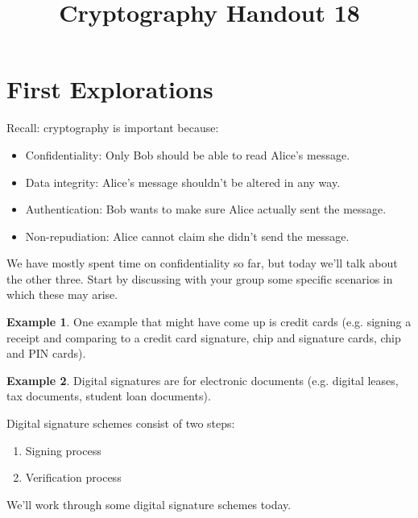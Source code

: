 \documentclass[12pt]{amsart}
\makeatletter
\def\subtitle#1{\gdef\@subtitle{#1}}
\def\@subtitle{}
\theoremstyle{plain}
\theoremstyle{definition}
\newtheorem*{ex}{Example}
\theoremstyle{remark}
\makeatother
\begin{document}
\onehalfspacing

\title[]{Cryptography Handout 18}
\subtitle{Digital Signatures}
\maketitle

\section{First Explorations}
Recall: cryptography is important because:
\begin{itemize}
	\item Confidentiality: Only Bob should be able to read Alice's message.
	\item Data integrity: Alice's message shouldn't be altered in any way.
	\item Authentication: Bob wants to make sure Alice actually sent the message.
	\item Non-repudiation: Alice cannot claim she didn't send the message.
\end{itemize}

We have mostly spent time on confidentiality so far, but today we'll talk about the other three.  Start by discussing with your group some specific scenarios in which these may arise.\\

\vspace{1in}


\begin{ex}
One example that might have come up is credit cards (e.g. signing a receipt and comparing to a credit card signature, chip and signature cards, chip and PIN cards).
\end{ex}

\begin{ex}
Digital signatures are for electronic documents (e.g. digital leases, tax documents, student loan documents).  
\end{ex}

\begin{framed}
Digital signature schemes consist of two steps:
\begin{enumerate}[1.]
	\item Signing process
	\item Verification process
\end{enumerate}
\end{framed}

\noindent We'll work through some digital signature schemes today.\\
\end{document}
